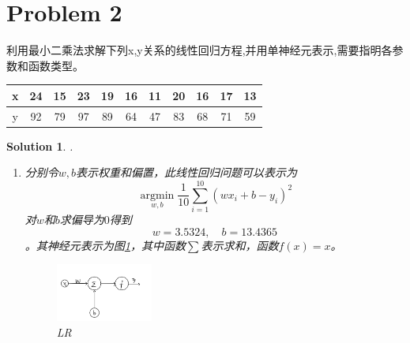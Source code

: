 \documentclass[a4paper,UTF8]{article}
\numberwithin{equation}{section}
\newtheorem*{solution}{Solution}
\begin{document}
\section*{Problem 2}
利用最小二乘法求解下列x,y关系的线性回归方程,并用单神经元表示,需要指明各参数和函数类型。
\begin{table}[!htbp]
	\centering
\begin{tabular}{|c|c|c|c|c|c|c|c|c|c|c|}%
	\hline  %
	x&24&15&23&19&16&11&20&16&17&13\\
	\hline  %
	y&92&79&97&89&64&47&83&68&71&59\\
	\hline %
\end{tabular}
\end{table}
\begin{solution}.
	\begin{enumerate}[$\bullet$]
		\item 分别令$w,b$表示权重和偏置，此线性回归问题可以表示为 $$\mathop{\arg\min}\limits_{w,b} \frac{1}{10}\sum_{i=1}^{10}(wx_i+b-y_i)^2$$
		对$w$和$b$求偏导为$0$得到$$w=3.5324,\quad b=13.4365$$。其神经元表示为图\ref{lr}，其中函数$\sum$表示求和，函数$f(x)=x$。
		\begin{figure}[h]
			\centering
			\includegraphics[width=0.3\textwidth]{lr.png}
			\caption{LR}
			\label{lr}
		\end{figure}
	\end{enumerate}
\end{solution}
\end{document}

